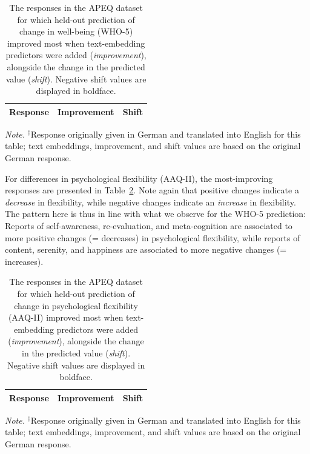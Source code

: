\documentclass[man,floatsintext]{apa7}
\newcommand{\change}[1]{#1}
\begin{document}
\begin{table}[!htbp]
\centering
\caption{The  responses in the APEQ dataset for which \change{held-out} prediction of change in well-being (WHO-5) improved most when text-embedding predictors were added (\emph{improvement}), alongside the change in the predicted value (\emph{shift}). Negative shift values are displayed in boldface. } 
\label{tab:examples_APEQ}
\scriptsize
\begin{threeparttable}
\begin{tabular}{p{12cm}rr}
 \hline
Response & Improvement & Shift \\
  \hline

\end{tabular}
\begin{tablenotes}[flushleft]
\item \textit{Note.} $^{\dagger}$Response originally given in German and translated into English for this table; text embeddings, improvement, and shift values are based on the original German response.
\end{tablenotes}
\end{threeparttable}
\end{table}


For differences in psychological flexibility (AAQ-II), the most-improving responses are presented in Table~\ref{tab:examples_APEQ_AAQ}. \change{Note again that positive changes indicate a \emph{decrease} in flexibility, while negative changes indicate an \emph{increase} in flexibility.} The pattern here \change{is thus in line with what we observe for} the WHO-5 prediction: Reports of self-awareness, re-evaluation, and meta-cognition are associated to more positive changes \change{(= decreases)} in psychological flexibility, while reports of content, serenity, and happiness are associated to more negative changes \change{(= increases)}. 

\begin{table}[!htbp]
\centering
\caption{The  responses in the APEQ dataset for which \change{held-out} prediction of change in psychological flexibility (AAQ-II) improved most when text-embedding predictors were added (\emph{improvement}), alongside the change in the predicted value (\emph{shift}). Negative shift values are displayed in boldface. }
\label{tab:examples_APEQ_AAQ}
\begingroup\scriptsize
\begin{threeparttable}
\begin{tabular}{p{12cm}rr}
  \hline
Response & Improvement & Shift \\
  \hline

   \end{tabular}
\begin{tablenotes}[flushleft]
\item \textit{Note.} $^{\dagger}$Response originally given in German and translated into English for this table; text embeddings, improvement, and shift values are based on the original German response.
\end{tablenotes}
\end{threeparttable}
\endgroup
\end{table}
\end{document}
